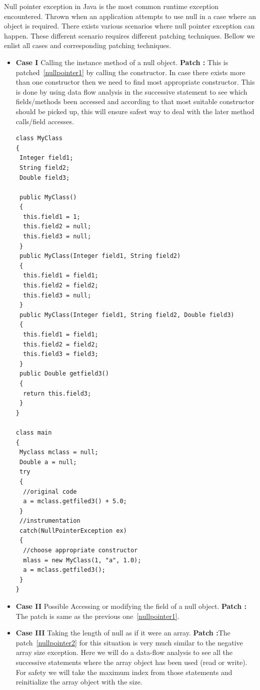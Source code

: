 Null pointer exception in Java is the most common runtime exception encountered. 
Thrown when an application attempts to use null in a case where an object is
required. There exists various scenarios where null pointer exception can
happen. These different scenario requires different patching techniques. Bellow
we enlist all cases and corresponding patching techniques.


\begin{itemize}
  \item \textbf{Case I} Calling the instance method of a null object. \newline
  \textbf{Patch :} This is patched~\ref{nullpointer1} by calling the
  constructor.
  In case there exists more than one constructor then we need to find most appropriate
  constructor. This is done by using data flow analysis in the successive
  statement to see which fields/methods been accessed and according to that
  most suitable constructor should be picked up, this will ensure safest way to
  deal with the later method calls/field accesses.
  

\onehalfspacing
\lstset{language=Java, caption=appropriate constructor, label=nullpointer1}

\begin{lstlisting}
class MyClass
{
 Integer field1;
 String field2;
 Double field3;

 public MyClass()
 {
  this.field1 = 1;
  this.field2 = null;
  this.field3 = null;
 } 
 public MyClass(Integer field1, String field2)
 {
  this.field1 = field1;
  this.field2 = field2;
  this.field3 = null;
 } 
 public MyClass(Integer field1, String field2, Double field3)
 {
  this.field1 = field1;
  this.field2 = field2;
  this.field3 = field3;
 }
 public Double getfield3()
 {
  return this.field3;
 }
}

class main
{
 Myclass mclass = null;
 Double a = null;
 try
 {
  //original code
  a = mclass.getfiled3() + 5.0;
 }
 //instrumentation
 catch(NullPointerException ex)
 {
  //choose appropriate constructor
  mlass = new MyClass(1, "a", 1.0); 
  a = mclass.getfiled3();
 }
}
\end{lstlisting}
 
 \doublespacing
  
  \item \textbf{Case II} Possible Accessing or modifying the field of a null
  object.\newline
  \textbf{Patch :} The patch is same as the previous one~\ref{nullpointer1}.
  
  \item \textbf{Case III} Taking the length of null as if it were an
  array.\newline
  \textbf{Patch :}The patch~\ref{nullpointer2} for this situation is very much
  similar to the negative array size exception. Here we will do a data-flow analysis to see all
  the successive statements where the array object has been used (read or
  write). For safety we will take the maximum index from those statements and
  reinitialize the array object with the size.



\end{itemize}
